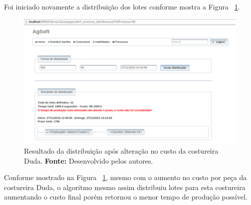 \par Foi iniciado novamente a distribuição dos lotes conforme mostra a Figura ~\ref{fig:resultado2_teste6}.

\begin{figure}[h!]
	\centerline{\includegraphics[scale=0.3]{./imagens/resultado2_teste6.png}}
	\caption[Resultado da distribuição após alteração no custo da costureira Duda.] 
	{Resultado da distribuição após alteração no custo da costureira Duda. \textbf{Fonte:} Desenvolvido pelos
	autores.}
	\label{fig:resultado2_teste6}
\end{figure}

\par Conforme mostrado na Figura ~\ref{fig:resultado2_teste6}, mesmo com o
aumento no custo por peça da costureira Duda, o algoritmo mesmo assim distribuiu
lotes para esta costureira aumentando o custo final porém retornou o
menor tempo de produção possível.
